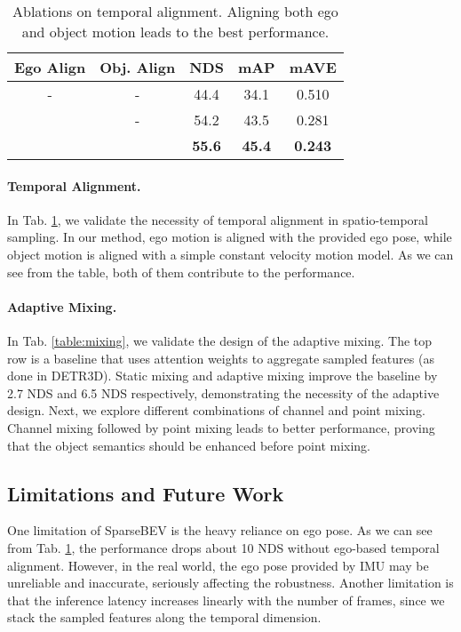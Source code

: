 \documentclass[10pt,twocolumn,letterpaper]{article}
\begin{document}
\begin{table}[t]
  \centering
  \begin{tabular}{cc|ccc}
    \toprule
    Ego Align & Obj. Align & NDS & mAP & mAVE \\
    \midrule
    - & - & 44.4 & 34.1 & 0.510 \\
     & - & 54.2 & 43.5 & 0.281 \\
     &  & \textbf{55.6} & \textbf{45.4} & \textbf{0.243} \\
    \bottomrule
  \end{tabular}
  \caption{Ablations on temporal alignment. Aligning both ego and object motion leads to the best performance.}
  \label{table:temporal_align}
  \vspace{-6pt}
\end{table}

\vspace{-5pt}
\paragraph{Temporal Alignment.} In Tab. \ref{table:temporal_align}, we validate the necessity of temporal alignment in spatio-temporal sampling. In our method, ego motion is aligned with the provided ego pose, while object motion is aligned with a simple constant velocity motion model. As we can see from the table, both of them contribute to the performance.

\vspace{-5pt}
\paragraph{Adaptive Mixing.} In Tab. \ref{table:mixing}, we validate the design of the adaptive mixing.
The top row is a baseline that uses attention weights to aggregate sampled features (as done in DETR3D).
Static mixing and adaptive mixing improve the baseline by 2.7 NDS and 6.5 NDS respectively, demonstrating the necessity of the adaptive design.
Next, we explore different combinations of channel and point mixing. Channel mixing followed by point mixing leads to better performance, proving that the object semantics should be enhanced before point mixing.

\subsection{Limitations and Future Work}

One limitation of SparseBEV is the heavy reliance on ego pose. As we can see from Tab. \ref{table:temporal_align}, the performance drops about 10 NDS without ego-based temporal alignment. However, in the real world, the ego pose provided by IMU may be unreliable and inaccurate, seriously affecting the robustness. Another limitation is that the inference latency increases linearly with the number of frames, since we stack the sampled features along the temporal dimension.
\end{document}
